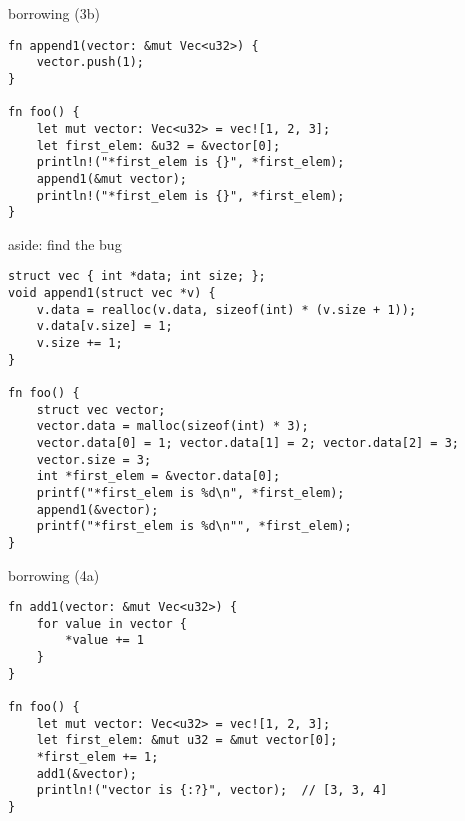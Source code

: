 \begin{frame}[fragile,label=rustBorrowing3]{borrowing (3b)}
\begin{verbatim}
fn append1(vector: &mut Vec<u32>) {
    vector.push(1);
}

fn foo() {
    let mut vector: Vec<u32> = vec![1, 2, 3];
    let first_elem: &u32 = &vector[0];
    println!("*first_elem is {}", *first_elem);
    append1(&mut vector);
    println!("*first_elem is {}", *first_elem);
}
\end{verbatim}
\end{frame}

\begin{frame}[fragile,label=rustBorrwing3AsC]{aside: find the bug}
\begin{lstlisting}[style=script]
struct vec { int *data; int size; };
void append1(struct vec *v) {
    v.data = realloc(v.data, sizeof(int) * (v.size + 1));
    v.data[v.size] = 1;
    v.size += 1;
}

fn foo() {
    struct vec vector;
    vector.data = malloc(sizeof(int) * 3);
    vector.data[0] = 1; vector.data[1] = 2; vector.data[2] = 3;
    vector.size = 3;
    int *first_elem = &vector.data[0];
    printf("*first_elem is %d\n", *first_elem);
    append1(&vector);
    printf("*first_elem is %d\n"", *first_elem);
}
\end{lstlisting}
\end{frame}

\begin{frame}[fragile,label=rustBorrowing4a]{borrowing (4a)}
\begin{verbatim}
fn add1(vector: &mut Vec<u32>) {
    for value in vector {
        *value += 1
    }
}

fn foo() {
    let mut vector: Vec<u32> = vec![1, 2, 3];
    let first_elem: &mut u32 = &mut vector[0];
    *first_elem += 1;
    add1(&vector);
    println!("vector is {:?}", vector);  // [3, 3, 4]
}
\end{verbatim}
\end{frame}

